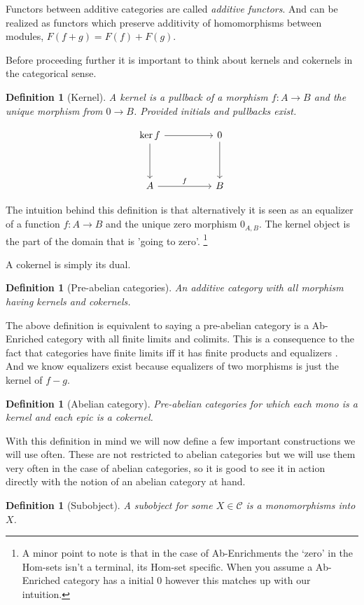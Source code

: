 \documentclass[12pt]{article}
\numberwithin{equation}{section}
\newcounter{dummy} \numberwithin{dummy}{section}
\newtheorem{definition}[dummy]{Definition}
\begin{document}
	Functors between additive categories are called \textit{additive functors}. And can be realized as functors which preserve additivity of homomorphisms between modules, $F(f+g)=F(f)+F(g).$
	
	Before proceeding further it is important to think about kernels and cokernels in the categorical sense.
	\begin{definition}[Kernel]
		A kernel is a pullback of a morphism $f:A \to B$ and the unique morphism from $0 \to B$. Provided initials and pullbacks exist.
		
		\[\begin{tikzcd}
			{\ker f} && 0 \\
			\\
			A && B
			\arrow["f", from=3-1, to=3-3]
			\arrow[from=1-3, to=3-3]
			\arrow[from=1-1, to=1-3]
			\arrow[from=1-1, to=3-1]
		\end{tikzcd}\]
	\end{definition}
	The intuition behind this definition is that alternatively it is seen as an equalizer of a function $f:A \to B$ and the unique zero morphism $0_{A,B}$. The kernel object is the part of the domain that is 'going to zero'. \footnote{A minor point to note is that in the case of Ab-Enrichments the `zero' in the Hom-sets isn't a terminal, its Hom-set specific. When you assume a Ab-Enriched category has a initial 0 however this matches up with our intuition.}
	
	A cokernel is simply its dual.
	
	\begin{definition}[Pre-abelian categories]
		An additive category with all morphism having kernels and cokernels.
	\end{definition}
	The above definition is equivalent to saying a pre-abelian category is a Ab-Enriched category with all finite limits and colimits. This is a consequence to the fact that categories have finite limits iff it has finite products and equalizers \cite[Prop.~5.21]{Awodey}. And we know equalizers exist because equalizers of two morphisms is just the kernel of $f-g$.
	
	
	
	
	\begin{definition}[Abelian category]
		Pre-abelian categories for which each mono is a kernel and each epic is a cokernel.
	\end{definition}
	
	With this definition in mind we will now define a few important constructions we will use often. These are not restricted to abelian categories but we will use them very often in the case of abelian categories, so it is good to see it in action directly with the notion of an abelian category at hand.
	\begin{definition}[Subobject]
		A subobject for some $X \in \mathcal{C}$ is a monomorphisms into $X$. 
	\end{definition}
	
\end{document}
